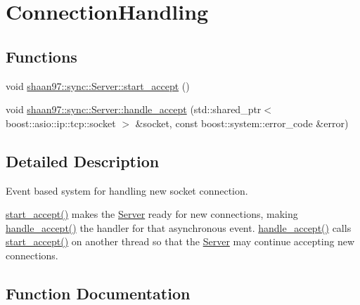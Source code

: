 \hypertarget{group___connection_handling}{}\section{Connection\+Handling}
\label{group___connection_handling}
\subsection*{Functions}
\begin{DoxyCompactItemize}
\item 
void \hyperlink{group___connection_handling_gab19cf3e5b775cd1b4eeb6d936340e712}{shaan97\+::sync\+::\+Server\+::start\+\_\+accept} ()
\item 
void \hyperlink{group___connection_handling_ga447569609c9d667ab509e61d1dd1b476}{shaan97\+::sync\+::\+Server\+::handle\+\_\+accept} (std\+::shared\+\_\+ptr$<$ boost\+::asio\+::ip\+::tcp\+::socket $>$ \&socket, const boost\+::system\+::error\+\_\+code \&error)
\end{DoxyCompactItemize}


\subsection{Detailed Description}
Event based system for handling new socket connection.

{\ttfamily \hyperlink{group___connection_handling_gab19cf3e5b775cd1b4eeb6d936340e712}{start\+\_\+accept()}} makes the \hyperlink{classshaan97_1_1sync_1_1_server}{Server} ready for new connections, making {\ttfamily \hyperlink{group___connection_handling_ga447569609c9d667ab509e61d1dd1b476}{handle\+\_\+accept()}} the handler for that asynchronous event. {\ttfamily \hyperlink{group___connection_handling_ga447569609c9d667ab509e61d1dd1b476}{handle\+\_\+accept()}} calls {\ttfamily \hyperlink{group___connection_handling_gab19cf3e5b775cd1b4eeb6d936340e712}{start\+\_\+accept()}} on another thread so that the \hyperlink{classshaan97_1_1sync_1_1_server}{Server} may continue accepting new connections. 

\subsection{Function Documentation}
\mbox{\label{group___connection_handling_ga447569609c9d667ab509e61d1dd1b476}} 
